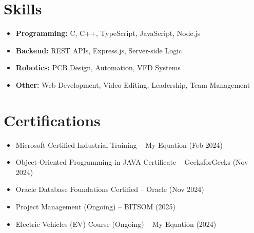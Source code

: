 \documentclass[a4paper,12pt]{article}
\begin{document}


\section{Skills}
\begin{itemize}[noitemsep, topsep=0pt] %
    \item \textbf{Programming:} C, C++, TypeScript, JavaScript, Node.js
    \item \textbf{Backend:} REST APIs, Express.js, Server-side Logic
    \item \textbf{Robotics:} PCB Design, Automation, VFD Systems
    \item \textbf{Other:} Web Development, Video Editing, Leadership, Team Management
\end{itemize}

\section*{Certifications}
\begin{itemize}
    \item Microsoft Certified Industrial Training – My Equation (Feb 2024)
    \item Object-Oriented Programming in JAVA Certificate – GeeksforGeeks (Nov 2024)
    \item Oracle Database Foundations Certified – Oracle (Nov 2024)
    \item Project Management (Ongoing) – BITSOM (2025)
    \item Electric Vehicles (EV) Course (Ongoing) – My Equation (2024)
\end{itemize}
\end{document}
